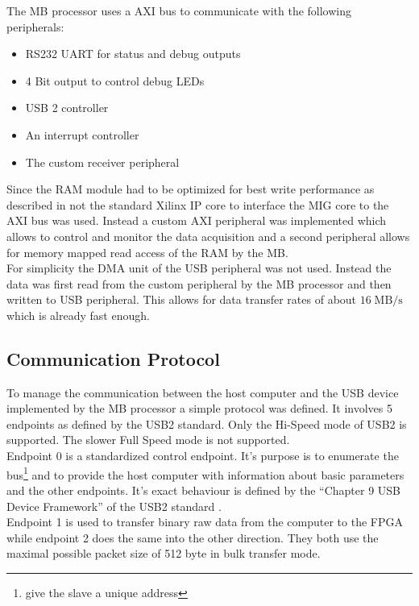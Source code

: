 The \gls{MB} processor uses a \gls{AXI} bus to communicate with the following
peripherals:
\begin{itemize}
\item RS232 \gls{UART} for status and debug outputs
\item 4 Bit output to control debug \glspl{LED}
\item USB 2 controller
\item An interrupt controller
\item The custom receiver peripheral
\end{itemize}

Since the \gls{RAM} module had to be optimized for best write performance
as described in  not the standard Xilinx \gls{IP}
core to interface the \gls{MIG} core to the \gls{AXI} bus was used.
Instead a custom \gls{AXI} peripheral was implemented which allows to
control and monitor the data acquisition and a second peripheral allows
for memory mapped read access of the \gls{RAM} by the \gls{MB}. \\

For simplicity the \gls{DMA} unit of the \gls{USB} peripheral was not used.
Instead the data was first read from the custom peripheral
by the \gls{MB} processor and then written to \gls{USB} peripheral.
This allows for data transfer rates of about $16 \;\text{MB} / \text{s}$
which is already fast enough. \\

\subsection{Communication Protocol}
To manage the communication between the host computer and the \gls{USB} device
implemented by the \gls{MB} processor a simple protocol was defined.
It involves 5 endpoints as defined by the \gls{USB}2 standard.
Only the Hi-Speed mode of \gls{USB}2 is supported. The slower Full Speed mode
is not supported. \\

Endpoint 0 is a standardized control endpoint. It's purpose is to
enumerate the bus\footnote{give the slave a unique address} and to provide the
host computer with information about basic parameters and the other endpoints.
It's exact behaviour is defined by the
``Chapter 9 USB Device Framework'' of the \gls{USB}2 standard \cite{usb20}. \\

Endpoint 1 is used to transfer binary raw data from the computer to the \gls{FPGA}
while endpoint 2 does the same into the other direction. They both use the maximal
possible packet size of 512 byte in bulk transfer mode. \\

